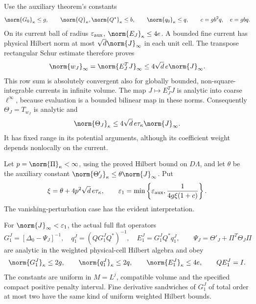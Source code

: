 Use the auxiliary theorem's constants
\[
 \norm{G_0}_\kappa\le g,\qquad
 \norm{Q}_\kappa,\norm{Q^*}_\kappa\le b,\qquad
 \norm{q_0}_\kappa\le q,
 \qquad c=gb^2q,\quad e=gbq.
\]
On its current ball of radius $\varepsilon_{\rm aux}$,
$\norm{E_J}_\kappa\le4e$. A bounded fine current has physical
Hilbert norm at most $\sqrt d\norm{J}_\infty$ in each unit cell.
The transpose rectangular Schur estimate therefore proves
\begin{equation}
 \norm{w_J}_\infty=\norm{E_J^TJ}_\infty
       \le4\sqrt d\,e\norm{J}_\infty.
 \label{fc-weight-bound}
\end{equation}
This row sum is absolutely convergent also for globally bounded,
non-square-integrable currents in infinite volume.
The map $J\mapsto E_J^TJ$ is analytic into coarse
$\ell^\infty$, because evaluation is a bounded bilinear map in
these norms. Consequently $\Theta_J=T_{w_J}$ is analytic and
\begin{equation}
 \norm{\Theta_J}_\kappa
       \le4\sqrt d\,e\tau_\kappa\norm{J}_\infty.
 \label{fc-Theta-bound}
\end{equation}
It has fixed range in its potential arguments, although its
coefficient weight depends nonlocally on the current.

Let $p=\norm{\Pi}_\kappa<\infty$, using the proved Hilbert bound
on $D\Lambda$, and let $\theta$ be the auxiliary constant
$\norm{\Theta'_J}_\kappa\le\theta\norm{J}_\infty$. Put
\begin{equation}
 \xi=\theta+4p^2\sqrt d\,e\tau_\kappa,
 \qquad
 \varepsilon_1=\min\left\{\varepsilon_{\rm aux},
              \frac1{4g\xi(1+c)}\right\}.
 \label{fc-full-radius}
\end{equation}
The vanishing-perturbation case has the evident interpretation.

\begin{theorem}
\label{fc-full-family-theorem}
For $\norm{J}_\infty<\varepsilon_1$, the actual full flat operators
\begin{equation}
 G_1^J=[\Delta_0-\Psi_J]^{-1},\quad
 q_1^J=(QG_1^JQ^*)^{-1},\quad E_1^J=G_1^JQ^*q_1^J,
 \qquad \Psi_J=\Theta'_J+\Pi^T\Theta_J\Pi
 \label{fc-full-family}
\end{equation}
are analytic in the weighted physical-cell Hilbert algebra and obey
\begin{equation}
 \norm{G_1^J}_\kappa\le2g,\qquad
 \norm{q_1^J}_\kappa\le2q,\qquad
 \norm{E_1^J}_\kappa\le4e,
 \qquad QE_1^J=I.
 \label{fc-full-family-bounds}
\end{equation}
The constants are uniform in $M=L^j$, compatible volume and the
specified compact positive penalty interval. Fine derivative
sandwiches of $G_1^J$ of total order at most two have the same kind
of uniform weighted Hilbert bounds.
\end{theorem}

